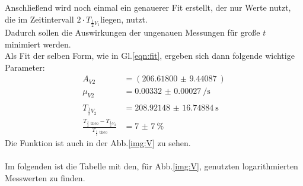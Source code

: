 \newline
\noindent
Anschließend wird noch einmal ein genauerer Fit erstellt, der nur Werte nutzt, die im Zeitintervall $2\cdot T_{\frac{1}{2}V_1}$liegen, nutzt.\\
Dadurch sollen die Auswirkungen der ungenauen Messungen für große $t$ minimiert werden.\\
Als Fit der selben Form, wie in Gl.\ref{eqn:fit}, ergeben sich dann folgende wichtige Parameter:
\begin{align*}
    A_{V2}&=(\SI{206.61800(944087)}{})\\
    \mu_{V2}&=\SI{0.00332(27)}{\per\second}\\\\
    T_{\frac{1}{2}V_2}&= \SI{208.92148(1674884)}{\second}\\
    \frac{T_{\frac{1}{2}\text{ theo}}-T_{\frac{1}{2}V_2}}{T_{\frac{1}{2}\text{ theo}}}&=\SI{7(7)}{\percent}
\end{align*}
Die Funktion ist auch in der Abb.\ref{img:V} zu sehen.\\\\
\noindent
Im folgenden ist die Tabelle mit den, für Abb.\ref{img:V}, genutzten logarithmierten Messwerten zu finden. 
\newpage
